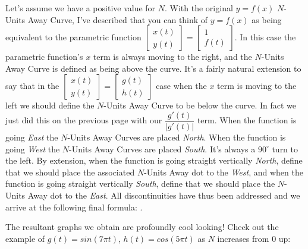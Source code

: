 Let's assume we have a positive value for $N$. With the original $y = f(x)$ $N$-Units Away Curve, I've described that you can think of $y = f(x)$ as being equivalent to the parametric function $\begin{bmatrix} x(t) \\ y(t) \end{bmatrix} =  \begin{bmatrix} 1 \\ f(t) \end{bmatrix}$. In this case the parametric function's $x$ term is always moving to the right, and the $N$-Units Away Curve is defined as being above the curve. It's a fairly natural extension to say that in the $\begin{bmatrix} x(t) \\ y(t) \end{bmatrix} =  \begin{bmatrix} g(t) \\ h(t) \end{bmatrix}$ case when the $x$ term is moving to the left we should define the $N$-Units Away Curve to be below the curve. In fact we just did this on the previous page with our $\dfrac{g'(t)}{|g'(t)|}$ term. When the function is going \textit{East} the $N$-Units Away Curves are placed \textit{North}. When the function is going \textit{West} the $N$-Units Away Curves are placed \textit{South}. It's always a $90^{\circ}$ turn to the left. By extension, when the function is going straight vertically \textit{North}, define that we should place the associated $N$-Units Away dot to the \textit{West}, and when the function is going straight vertically \textit{South}, define that we should place the $N$-Units Away dot to the \textit{East}. All discontinuities have thus been addressed and we arrive at the following final formula: \finalFormula.

The resultant graphs we obtain are profoundly cool looking! Check out the example of $g(t) = sin (7 \pi t)$, $h(t) = cos (5 \pi t)$ as $N$ increases from 0 up:

